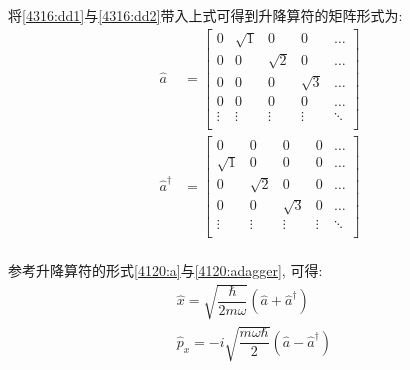 \documentclass[a4paper, 11pt]{article}
\begin{document}
\begin{spacing}{1.2}
        将\eqref{4316:dd1}与\eqref{4316:dd2}带入上式可得到升降算符的矩阵形式为:
        \begin{equation}
          \begin{aligned}
          \hat{a} &= 
          \begin{bmatrix}
            0      & \sqrt{1} & 0        & 0       &\ldots \\
            0      & 0        & \sqrt{2} & 0       &\ldots \\
            0      & 0        & 0        & \sqrt{3}&\ldots \\
            0      & 0        & 0        & 0       &\ldots \\
            \vdots & \vdots   & \vdots   & \vdots  &\ddots \\
          \end{bmatrix}\\[4pt]
          \hat{a}^{\dagger} &= 
          \begin{bmatrix}
            0       & 0        & 0        & 0       &\ldots \\
            \sqrt{1}& 0        & 0        & 0       &\ldots \\
            0       & \sqrt{2} & 0        & 0       &\ldots \\
            0       & 0        & \sqrt{3} & 0       &\ldots \\
            \vdots  & \vdots   & \vdots   & \vdots  &\ddots \\
          \end{bmatrix}\\
          \end{aligned}
        \end{equation}

        参考升降算符的形式\eqref{4120:a}与\eqref{4120:adagger}, 可得:
        \begin{equation}
          \begin{aligned}
            \hat{x} = \sqrt{\dfrac{\hbar}{2m\omega}}\left(\hat{a}+\hat{a}^{\dagger}\right)&\\
            \hat{p}_x = -i\sqrt{\dfrac{m\omega\hbar}{2}}\left(\hat{a}-\hat{a}^{\dagger}\right)&
          \end{aligned}
        \end{equation}


\end{spacing}
\end{document}

